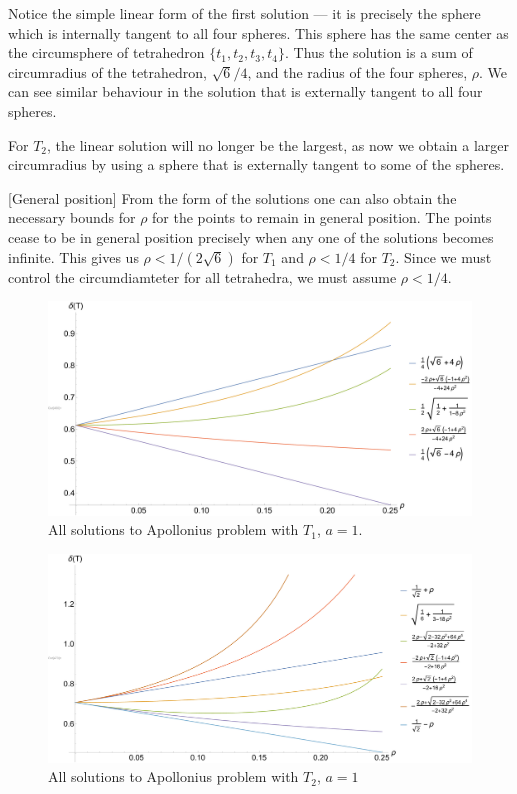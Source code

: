 Notice the simple linear form of the first solution --- it is precisely the sphere which is internally tangent to all four spheres. This sphere has the same center as the circumsphere of tetrahedron $\{t_1,t_2,t_3,t_4\}$. Thus the solution is a sum of circumradius of the tetrahedron, $\sqrt 6 /4$, and the radius of the four spheres, $\rho$. We can see similar behaviour in the solution that is externally tangent to all four spheres.

For $T_2$, the linear solution will no longer be the largest, as now we obtain a larger circumradius by using a sphere that is externally tangent to some of the spheres. 


\begin{remark}\label{rem:GP}[General position]
	From the form of the solutions one can also obtain the necessary bounds for $\rho$ for the points to remain in general position. The points cease to be in general position precisely when any one of the solutions becomes infinite. This gives us $\rho < 1/(2\sqrt 6)$ for $T_1$ and $\rho<1/4$ for $T_2$. Since we must control the circumdiamteter for all tetrahedra, we must assume $\rho < 1/4$.
\end{remark}


\begin{figure}
	\includegraphics[width=1\textwidth]{../img/t1.pdf}
	\caption{All solutions to Apollonius problem with $T_1$, $a=1$.}\label{fig:Apollonius1}
\end{figure}

\begin{figure}
	\includegraphics[width=1\textwidth]{../img/t2.pdf}
	\caption{All solutions to Apollonius problem with $T_2$, $a=1$}\label{fig:Apollonius2}
\end{figure}

